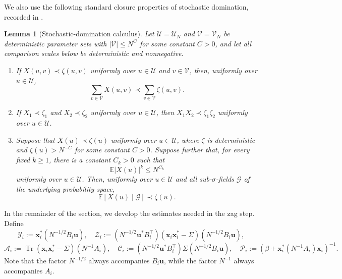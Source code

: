 \documentclass[11pt,reqno]{amsart}
\def\u{\mathbf{u}}
\def\x{\mathbf{x}}
\def\E{\mathbb{E}}
\def\cA{\mathcal{A}}
\def\cU{\mathcal{U}}
\def\cY{\mathcal{Y}}
\def\cZ{\mathcal{Z}}
\def\cP{\mathcal{P}}
\def\cC{\mathcal{C}}
\def\cV{\mathcal{V}}
\def\Tr{\operatorname{Tr}}
\newtheorem{lemma}[theorem]{Lemma}
\theoremstyle{definition}
\numberwithin{equation}{section}
\numberwithin{figure}{section}
\begin{document}
We also use the following standard closure properties of stochastic domination, recorded in \cite[Lemma~3.3]{fan2026anisotropic}.
\begin{lemma}[Stochastic-domination calculus]\label{lem:stochastic-domination-calculus}
Let $\cU=\cU_N$ and $\cV=\cV_N$ be deterministic parameter sets with $|\cV|\leq N^C$ for some constant $C>0$, and let all comparison scales below be deterministic and nonnegative.
\begin{enumerate}[label=(\alph*)]
    \item If $X(u,v)\prec \zeta(u,v)$ uniformly over $u\in\cU$ and $v\in\cV$, then, uniformly over $u\in\cU$,
    \[
        \sum_{v\in\cV}X(u,v)\prec\sum_{v\in\cV}\zeta(u,v).
    \]
    \item If $X_1\prec\zeta_1$ and $X_2\prec\zeta_2$ uniformly over $u\in\cU$, then $X_1X_2\prec\zeta_1\zeta_2$ uniformly over $u\in\cU$.
    \item Suppose that $X(u)\prec\zeta(u)$ uniformly over $u\in\cU$, where $\zeta$ is deterministic and $\zeta(u)>N^{-C}$ for some constant $C>0$. Suppose further that, for every fixed $k\geq 1$, there is a constant $C_k>0$ such that
    \[
        \E|X(u)|^k\leq N^{C_k}
    \]
    uniformly over $u\in\cU$. Then, uniformly over $u\in\cU$ and all sub-$\sigma$-fields $\mathcal G$ of the underlying probability space,
    \[
        \E[X(u)\mid\mathcal G]\prec\zeta(u).
    \]
\end{enumerate}
\end{lemma}

In the remainder of the section, we develop the estimates needed in the zag step. Define
\[
    \cY_i:=\x_i^*(N^{-1/2}B_i\u),\quad \cZ_i:=(N^{-1/2}\u^*B_i^\top)(\x_i\x_i^*-\Sigma)(N^{-1/2}B_i\u),
\]
\[
    \cA_i:=\Tr(\x_i\x_i^*-\Sigma)(N^{-1}A_i),\quad \cC_i:=(N^{-1/2}\u^*B_i^\top)\Sigma(N^{-1/2}B_i\u),\quad \cP_i:=(\beta+\x_i^*(N^{-1}A_i)\x_i)^{-1}.
\]
Note that the factor $N^{-1/2}$ always accompanies $B_i\u$, while the factor $N^{-1}$ always accompanies $A_i$.
\end{document}
